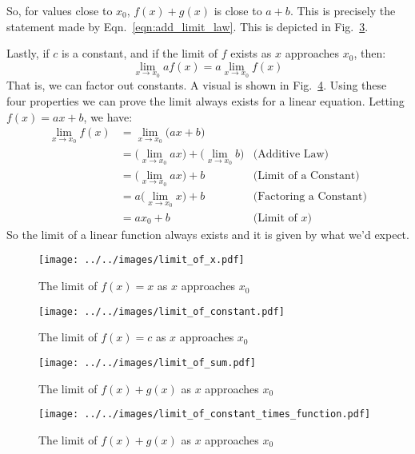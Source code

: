 \documentclass{article}
\begin{document}
    So, for values close to $x_{0}$, $f(x)+g(x)$ is close to $a+b$. This is
    precisely the statement made by Eqn.~\ref{eqn:add_limit_law}. This is
    depicted in Fig.~\ref{fig:limit_of_sum}.
    \par\hfill\par
    Lastly, if $c$ is a constant, and if the limit of $f$ exists as $x$
    approaches $x_{0}$, then:
    \begin{equation}
        \lim_{x\rightarrow{x}_{0}}af(x)=a\lim_{x\rightarrow{x}_{0}}f(x)
    \end{equation}
    That is, we can factor out constants. A visual is shown in
    Fig.~\ref{fig:limit_of_constant_times_function}. Using these four
    properties we can prove the limit always exists for a linear equation.
    Letting $f(x)=ax+b$, we have:
    \begin{align}
        \lim_{x\rightarrow{x}_{0}}f(x)
        &=\lim_{x\rightarrow{x}_{0}}\big(ax+b\big)\\
        &=\Big(\lim_{x\rightarrow{x}_{0}}ax\Big)
            +\Big(\lim_{x\rightarrow{x}_{0}}b\Big)
            &\text{(Additive Law)}\\
        &=\Big(\lim_{x\rightarrow{x}_{0}}ax\Big)+b
            &\text{(Limit of a Constant)}\\
        &=a\Big(\lim_{x\rightarrow{x}_{0}}x\Big)+b
            &\text{(Factoring a Constant)}\\
        &=ax_{0}+b
            &\text{(Limit of $x$)}
    \end{align}
    So the limit of a linear function always exists and it is given by what
    we'd expect.
    \begin{figure}
        \centering
        \texttt{[image: ../../images/limit\_of\_x.pdf]}
        \caption{The limit of $f(x)=x$ as $x$ approaches $x_{0}$}
        \label{fig:lim_f_of_x_equals_x}
    \end{figure}
    \begin{figure}
        \centering
        \texttt{[image: ../../images/limit\_of\_constant.pdf]}
        \caption{The limit of $f(x)=c$ as $x$ approaches $x_{0}$}
        \label{fig:limit_of_constant}
    \end{figure}
    \begin{figure}
        \centering
        \texttt{[image: ../../images/limit\_of\_sum.pdf]}
        \caption{The limit of $f(x)+g(x)$ as $x$ approaches $x_{0}$}
        \label{fig:limit_of_sum}
    \end{figure}
    \begin{figure}
        \centering
        \texttt{[image: ../../images/limit\_of\_constant\_times\_function.pdf]}
        \caption{The limit of $f(x)+g(x)$ as $x$ approaches $x_{0}$}
        \label{fig:limit_of_constant_times_function}
    \end{figure}
\end{document}
